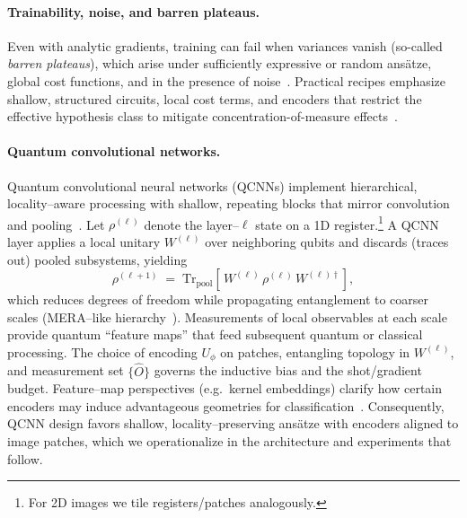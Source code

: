 \paragraph{Trainability, noise, and barren plateaus.}
Even with analytic gradients, training can fail when variances vanish (so-called \emph{barren plateaus}), which arise under sufficiently expressive or random ans\"atze, global cost functions, and in the presence of noise~\cite{McClean2018}. Practical recipes emphasize shallow, structured circuits, local cost terms, and encoders that restrict the effective hypothesis class to mitigate concentration-of-measure effects~\cite{SchuldPetruccione2021,cerezo2021}.


\paragraph{Quantum convolutional networks.}
Quantum convolutional neural networks (QCNNs) implement hierarchical, locality–aware processing
with shallow, repeating blocks that mirror convolution and pooling~\cite{Cong2019}.
Let $\rho^{(\ell)}$ denote the layer–$\ell$ state on a 1D register.\footnote{For 2D images we
tile registers/patches analogously.} A QCNN layer applies a local unitary $W^{(\ell)}$
over neighboring qubits and discards (traces out) pooled subsystems, yielding
\begin{equation}
\rho^{(\ell+1)} \;=\; \mathrm{Tr}_{\mathrm{pool}}
\!\left[\,W^{(\ell)}\,\rho^{(\ell)}\,W^{(\ell)\dagger}\right],
\label{eq:qcnn-pooling}
\end{equation}
which reduces degrees of freedom while propagating entanglement to coarser scales (MERA–like hierarchy~\cite{Cong2019,Vidal2007MERA}).
Measurements of local observables at each scale provide quantum ``feature maps'' that feed subsequent
quantum or classical processing. The choice of encoding $U_{\phi}$ on patches, entangling topology in $W^{(\ell)}$,
and measurement set $\{\hat{O}\}$ governs the inductive bias and the shot/gradient budget.
Feature–map perspectives (e.g.\ kernel embeddings) clarify how certain encoders may induce
advantageous geometries for classification~\cite{Havlicek2019,Schuld2019PRA}. Consequently, QCNN design favors shallow, locality–preserving ans\"atze with encoders aligned to image patches,
which we operationalize in the architecture and experiments that follow.

